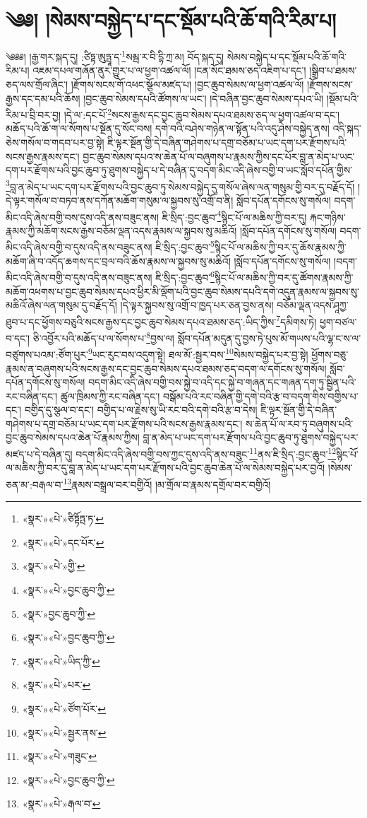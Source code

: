 \chapter{༄༅། །སེམས་བསྐྱེད་པ་དང་སྡོམ་པའི་ཆོ་གའི་རིམ་པ།}༄༅༅། །རྒྱ་གར་སྐད་དུ། :ཙིཏྟ་ཨུཏྤཱ་ད་\footnote{«སྣར་»«པེ་»ཙིཏྟོཏྤ་ཏ་}སམྦ་ར་བི་དྷི་ཀྲ་མ། བོད་སྐད་དུ། སེམས་བསྐྱེད་པ་དང་སྡོམ་པའི་ཆོ་གའི་རིམ་པ། འཇམ་དཔལ་གཞོན་ནུར་གྱུར་པ་ལ་ཕྱག་འཚལ་ལོ། །ངན་སོང་ཐམས་ཅད་འཇིག་པ་དང་། །སྒྲིབ་པ་ཐམས་ཅད་ལས་གྲོལ་ཞིང་། །རྫོགས་སངས་གོ་འཕང་སྩོལ་མཛད་པ། །བྱང་ཆུབ་སེམས་ལ་ཕྱག་འཚལ་ལོ། །རྫོགས་སངས་རྒྱས་དང་དམ་པའི་ཆོས། །བྱང་ཆུབ་སེམས་དཔའི་ཚོགས་ལ་ཡང་། །དེ་བཞིན་བྱང་ཆུབ་སེམས་དཔའ་ཡི། །སྡོམ་པའི་རིམ་པ་བྲི་བར་བྱ། །དེ་ལ་:དང་པོ་\footnote{«སྣར་»«པེ་»དང་པོར་}སངས་རྒྱས་དང་བྱང་ཆུབ་སེམས་དཔའ་ཐམས་ཅད་ལ་ཕྱག་འཚལ་བ་དང་། མཆོད་པའི་ཆོ་ག་ལ་སོགས་པ་སྔོན་དུ་སོང་བས། དགེ་བའི་བཤེས་གཉེན་ལ་སྟོན་པའི་འདུ་ཤེས་བསྐྱེད་ནས། འདི་སྐད་ཅེས་གསོལ་བ་གདབ་པར་བྱ་སྟེ། ཇི་ལྟར་སྔོན་གྱི་དེ་བཞིན་གཤེགས་པ་དགྲ་བཅོམ་པ་ཡང་དག་པར་རྫོགས་པའི་སངས་རྒྱས་རྣམས་དང་། བྱང་ཆུབ་སེམས་དཔའ་ས་ཆེན་པོ་ལ་བཞུགས་པ་རྣམས་ཀྱིས་དང་པོར་བླ་ན་མེད་པ་ཡང་དག་པར་རྫོགས་པའི་བྱང་ཆུབ་ཏུ་ཐུགས་བསྐྱེད་པ་དེ་བཞིན་དུ་བདག་མིང་འདི་ཞེས་བགྱི་བ་ཡང་སློབ་དཔོན་གྱིས་\footnote{«སྣར་»«པེ་»གྱི་}བླ་ན་མེད་པ་ཡང་དག་པར་རྫོགས་པའི་བྱང་ཆུབ་ཏུ་སེམས་བསྐྱེད་དུ་གསོལ་ཞེས་ལན་གསུམ་གྱི་བར་དུ་བརྗོད་དོ། །དེ་ལྟར་གསོལ་བ་བཏབ་ནས་དཀོན་མཆོག་གསུམ་ལ་སྐྱབས་སུ་འགྲོ་བ་ནི། སློབ་དཔོན་དགོངས་སུ་གསོལ། བདག་མིང་འདི་ཞེས་བགྱི་བས་དུས་འདི་ནས་བཟུང་ནས། ཇི་སྲིད་:བྱང་ཆུབ་\footnote{«སྣར་»«པེ་»བྱང་ཆུབ་ཀྱི་}སྙིང་པོ་ལ་མཆིས་ཀྱི་བར་དུ། རྐང་གཉིས་རྣམས་ཀྱི་མཆོག་སངས་རྒྱས་བཅོམ་ལྡན་འདས་རྣམས་ལ་སྐྱབས་སུ་མཆིའོ། །སློབ་དཔོན་དགོངས་སུ་གསོལ། བདག་མིང་འདི་ཞེས་བགྱི་བ་དུས་འདི་ནས་བཟུང་ནས། ཇི་སྲིད་:བྱང་ཆུབ་\footnote{«སྣར་»བྱང་ཆུབ་ཀྱི་}སྙིང་པོ་ལ་མཆིས་ཀྱི་བར་དུ་ཆོས་རྣམས་ཀྱི་མཆོག་ཞི་བ་འདོད་ཆགས་དང་བྲལ་བའི་ཆོས་རྣམས་ལ་སྐྱབས་སུ་མཆིའོ། །སློབ་དཔོན་དགོངས་སུ་གསོལ། །བདག་མིང་འདི་ཞེས་བགྱི་བ་དུས་འདི་ནས་བཟུང་ནས། ཇི་སྲིད་:བྱང་ཆུབ་\footnote{«སྣར་»«པེ་»བྱང་ཆུབ་ཀྱི་}སྙིང་པོ་ལ་མཆིས་ཀྱི་བར་དུ་ཚོགས་རྣམས་ཀྱི་མཆོག་འཕགས་པ་བྱང་ཆུབ་སེམས་དཔའ་ཕྱིར་མི་ལྡོག་པའི་བྱང་ཆུབ་སེམས་དཔའི་དགེ་འདུན་རྣམས་ལ་སྐྱབས་སུ་མཆིའོ་ཞེས་ལན་གསུམ་དུ་བརྗོད་དོ། །དེ་ལྟར་སྐྱབས་སུ་འགྲོ་བ་ཁྱད་པར་ཅན་བྱས་ནས། བཅོམ་ལྡན་འདས་ཤཱཀྱ་ཐུབ་པ་དང་ཕྱོགས་བཅུའི་སངས་རྒྱས་དང་བྱང་ཆུབ་སེམས་དཔའ་ཐམས་ཅད་:ཡིད་ཀྱིས་\footnote{«སྣར་»«པེ་»ཡིད་ཀྱི་}དམིགས་ཏེ། ཕྱག་བཙལ་བ་དང་། ཅི་འབྱོར་པའི་མཆོད་པ་ལ་སོགས་པ་\footnote{«སྣར་»«པེ་»པར་}བྱས་ལ། སློབ་དཔོན་མདུན་དུ་བྱས་ཏེ་པུས་མོ་གཡས་པའི་ལྷ་ང་ས་ལ་བཙུགས་པའམ་:ཙོག་པུར་\footnote{«སྣར་»«པེ་»ཙོག་པོར་}ཡང་རུང་བས་འདུག་སྟེ། ཐལ་མོ་:སྦྱར་བས་\footnote{«སྣར་»«པེ་»སྦྱར་ནས་}སེམས་བསྐྱེད་པར་བྱ་སྟེ། ཕྱོགས་བཅུ་རྣམས་ན་བཞུགས་པའི་སངས་རྒྱས་དང་བྱང་ཆུབ་སེམས་དཔའ་ཐམས་ཅད་བདག་ལ་དགོངས་སུ་གསོལ། སློབ་དཔོན་དགོངས་སུ་གསོལ། བདག་མིང་འདི་ཞེས་བགྱི་བས་སྐྱེ་བ་འདི་དང་སྐྱེ་བ་གཞན་དང་གཞན་དག་ཏུ་སྦྱིན་པའི་རང་བཞིན་དང་། ཚུལ་ཁྲིམས་ཀྱི་རང་བཞིན་དང་། བསྒོམ་པའི་རང་བཞིན་གྱི་དགེ་བའི་རྩ་བ་བདག་གིས་བགྱིས་པ་དང་། བགྱིད་དུ་སྩལ་བ་དང་། བགྱིད་པ་ལ་རྗེས་སུ་ཡི་རང་བའི་དགེ་བའི་རྩ་བ་དེས། ཇི་ལྟར་སྔོན་གྱི་དེ་བཞིན་གཤེགས་པ་དགྲ་བཅོམ་པ་ཡང་དག་པར་རྫོགས་པའི་སངས་རྒྱས་རྣམས་དང་། ས་ཆེན་པོ་ལ་རབ་ཏུ་བཞུགས་པའི་བྱང་ཆུབ་སེམས་དཔའ་ཆེན་པོ་རྣམས་ཀྱིས། བླ་ན་མེད་པ་ཡང་དག་པར་རྫོགས་པའི་བྱང་ཆུབ་ཏུ་ཐུགས་བསྐྱེད་པར་མཛད་པ་དེ་བཞིན་དུ། བདག་མིང་འདི་ཞེས་བགྱི་བས་ཀྱང་དུས་འདི་ནས་བཟུང་\footnote{«སྣར་»«པེ་»གཟུང་}ནས་ཇི་སྲིད་:བྱང་ཆུབ་\footnote{«སྣར་»«པེ་»བྱང་ཆུབ་ཀྱི་}སྙིང་པོ་ལ་མཆིས་ཀྱི་བར་དུ་བླ་ན་མེད་པ་ཡང་དག་པར་རྫོགས་པའི་བྱང་ཆུབ་ཆེན་པོ་ལ་སེམས་བསྐྱེད་པར་བྱའོ། །སེམས་ཅན་མ་:བརྒལ་བ་\footnote{«སྣར་»«པེ་»རྒལ་བ་}རྣམས་བསྒྲལ་བར་བགྱིའོ། །མ་གྲོལ་བ་རྣམས་དགྲོལ་བར་བགྱིའོ། 